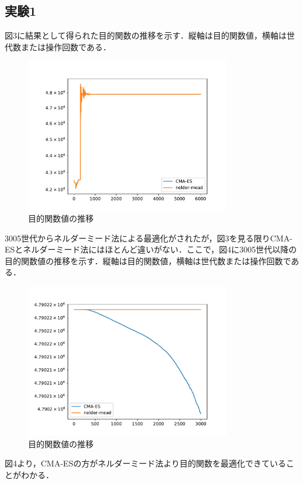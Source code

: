 \documentclass[twocolumn]{jarticle}
\begin{document}
	\subsection{実験1}
		図3に結果として得られた目的関数の推移を示す．縦軸は目的関数値，横軸は世代数または操作回数である．
		\begin{figure}
			\centering
            \includegraphics[width=9cm]{cmaes_nelder.pdf}
            \caption{目的関数値の推移}
        \end{figure}
		3005世代からネルダーミード法による最適化がされたが，図3を見る限りCMA-ESとネルダーミード法にはほとんど違いがない．ここで，図4に3005世代以降の目的関数値の推移を示す．縦軸は目的関数値，横軸は世代数または操作回数である．
		\begin{figure}
			\centering
            \includegraphics[width=9cm]{cmaes_nelder_v2.pdf}
            \caption{目的関数値の推移}
        \end{figure}
		図4より，CMA-ESの方がネルダーミード法より目的関数を最適化できていることがわかる．
\end{document}
